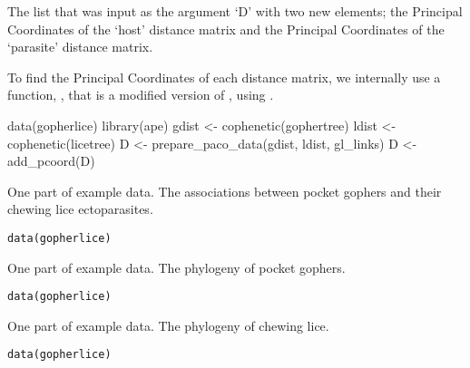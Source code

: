 \documentclass[letterpaper]{book}
\begin{document}
%
\begin{Value}
The list that was input as the argument `D' with two new elements; the Principal Coordinates of the `host' distance matrix and the Principal Coordinates of the `parasite' distance matrix.
\end{Value}
%
\begin{Note}\relax
To find the Principal Coordinates of each distance matrix, we internally use a function, , that is a modified version of , using .
\end{Note}
%
\begin{Examples}
\begin{ExampleCode}
data(gopherlice)
library(ape)
gdist <- cophenetic(gophertree)
ldist <- cophenetic(licetree)
D <- prepare_paco_data(gdist, ldist, gl_links)
D <- add_pcoord(D)
\end{ExampleCode}
\end{Examples}
%
\begin{Description}\relax
One part of example data. The associations between pocket gophers and their chewing lice ectoparasites.
\end{Description}
%
\begin{Usage}
\begin{verbatim}
data(gopherlice)
\end{verbatim}
\end{Usage}
%
\begin{Description}\relax
One part of example data. The phylogeny of pocket gophers.
\end{Description}
%
\begin{Usage}
\begin{verbatim}
data(gopherlice)
\end{verbatim}
\end{Usage}
%
\begin{Description}\relax
One part of example data. The phylogeny of chewing lice.
\end{Description}
%
\begin{Usage}
\begin{verbatim}
data(gopherlice)
\end{verbatim}
\end{Usage}
\end{document}
